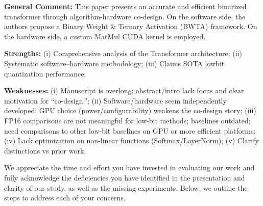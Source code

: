 
\reviewer

\begin{generalcomment}
\textbf{General Comment:} This paper presents an accurate and efficient binarized transformer through algorithm-hardware co-design. On the software side, the authors propose a Binary Weight \& Ternary Activation (BWTA) framework. On the hardware side, a custom MatMul CUDA kernel is employed.

\textbf{Strengths:} (i) Comprehensive analysis of the Transformer architecture; (ii) Systematic software–hardware methodology; (iii) Claims SOTA lowbit quantization performance. 

\textbf{Weaknesses:} (i) Manuscript is overlong; abstract/intro lack focus and clear motivation for ``co-design.''; (ii) Software/hardware seem independently developed; GPU choice (power/configurability) weakens the co-design story; (iii) FP16 comparisons are not meaningful for low-bit methods; baselines outdated; need comparisons to other low-bit baselines on GPU or more efficient platforms; (iv) Lack optimization on non-linear functions (Softmax/LayerNorm); (v) Clarify distinctions vs prior work. 
 
\end{generalcomment}

\begin{revmeta}[]
We appreciate the time and effort you have invested in evaluating our work and fully acknowledge the deficiencies you have identified in the presentation and clarity of our study, as well as the missing experiments.  Below, we outline the steps to address each of your concerns.  
\end{revmeta}

